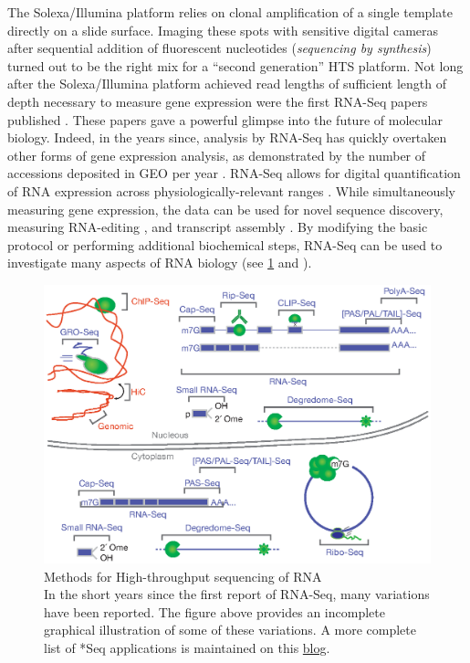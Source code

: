     The Solexa/Illumina platform relies on clonal amplification of a single template directly on a slide surface. Imaging these spots with sensitive digital cameras after sequential addition of fluorescent nucleotides (\textit{sequencing by synthesis}) turned out to be the right mix for a ``second generation'' HTS platform. Not long after the Solexa/Illumina platform achieved read lengths of sufficient length of depth necessary to measure gene expression were the first RNA-Seq papers published \citep{Mortazavi2008, Nagalakshmi2008,Lister2008}. These papers gave a powerful glimpse into the future of molecular biology. Indeed, in the years since, analysis by RNA-Seq has quickly overtaken other forms of gene expression analysis, as demonstrated by the number of accessions deposited in GEO per year \citep{Barrett2013}. RNA-Seq allows for digital quantification of RNA expression across physiologically-relevant ranges \citep{Blencowe2009}. While simultaneously measuring gene expression, the data can be used for novel sequence discovery, measuring RNA-editing \citep{Li2011}, and transcript assembly \citep{Trapnell2010}. By modifying the basic protocol or performing additional biochemical steps, RNA-Seq can be used to investigate many aspects of RNA biology (see \ref{fig:htsMethods} and \citep{Mutz2013}). 

    \begin{figure}[htbp] %
      \centering 
      \includegraphics{Figures/Intro/RNA_Sequencing_methodologies.eps}
      \caption[Methods for High-throughput sequencing of RNA]
      {
      Methods for High-throughput sequencing of RNA\\[0.25cm]
      In the short years since the first report of RNA-Seq, many variations have been reported. The figure above provides an incomplete graphical illustration of some of these variations. A more complete list of *Seq applications is maintained on this \href{http://liorpachter.wordpress.com/seq/}{blog}.
      }
      \label{fig:htsMethods}
      \end{figure}

